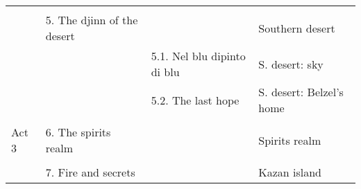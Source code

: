 \begin{table}[H]
{\begin{tabular}{|llll|}
\multicolumn{1}{|l|}{} &  &  &  \\ \cline{2-4} 
\multicolumn{1}{|l|}{} & \multicolumn{1}{l|}{5. The djinn of the desert} & \multicolumn{1}{l|}{} & Southern desert \\ \cline{2-4} 
\multicolumn{1}{|l|}{} & \multicolumn{1}{l|}{} & \multicolumn{1}{l|}{5.1. Nel blu dipinto di blu} & S. desert: sky \\ \cline{3-4} 
\multicolumn{1}{|l|}{} & \multicolumn{1}{l|}{} & \multicolumn{1}{l|}{5.2. The last hope} & S. desert: Belzel's home \\ \hline
 &  &  &  \\ \hline
\multicolumn{1}{|l|}{\cellcolor[HTML]{C0C0C0}Act 3} & \multicolumn{1}{l|}{6. The spirits realm} & \multicolumn{1}{l|}{} & Spirits realm \\ \hline
\multicolumn{1}{|l|}{} &  &  &  \\ \cline{2-4} 
\multicolumn{1}{|l|}{} & \multicolumn{1}{l|}{7. Fire and secrets} & \multicolumn{1}{l|}{} & Kazan island \\ \hline

\end{tabular}%
}
\end{table}
\hspace{0pt} \\ %
